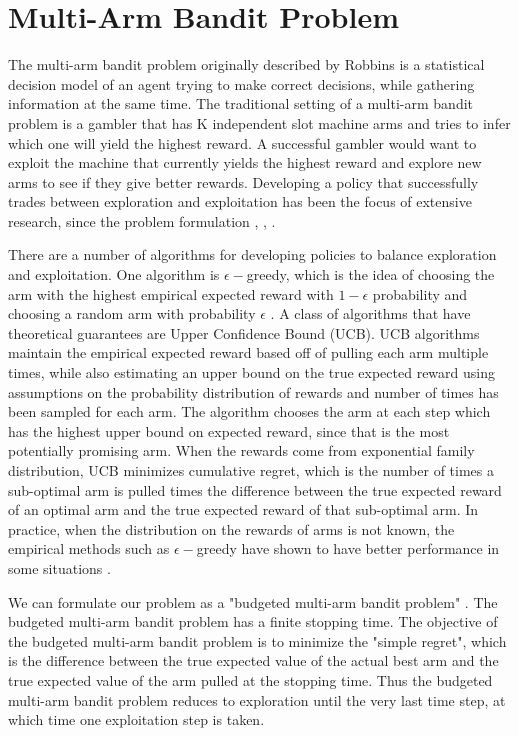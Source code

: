 \documentclass[letterpaper, 10 pt, conference]{ieeeconf}  %
\begin{document}
\section{Multi-Arm Bandit Problem}
The multi-arm bandit problem originally described by Robbins \cite{robbins1985some} is a statistical decision model of an agent trying to make correct decisions, while gathering information at the same time.
The traditional setting of a multi-arm bandit problem is a gambler that has K independent slot machine arms and tries to infer which one will yield the highest reward.
A successful gambler would want to exploit the machine that currently yields the highest reward and explore new arms to see if they give better rewards.
Developing a policy that successfully trades between exploration and exploitation has been the focus of extensive research, since the problem formulation \cite{bubeck2009pure}, \cite{robbins1952some}, \cite{bergemann2006bandit}. 

There are a number of algorithms for developing policies to balance exploration and exploitation.
One algorithm is $\epsilon-$greedy, which is the idea of choosing the arm with the highest empirical expected reward with $1-\epsilon$ probability and choosing a random arm with probability $\epsilon$ \cite{barto1998reinforcement}.
A class of algorithms that have theoretical guarantees are Upper Confidence Bound (UCB).
UCB algorithms maintain the empirical expected reward based off of pulling each arm multiple times, while also estimating an upper bound on the true expected reward using assumptions on the probability distribution of rewards and number of times has been sampled for each arm.
The algorithm chooses the arm at each step which has the highest upper bound on expected reward, since that is the most potentially promising arm.
When the rewards come from exponential family distribution, UCB minimizes cumulative regret, which is the number of times a sub-optimal arm is pulled times the difference between the true expected reward of an optimal arm and the true expected reward of that sub-optimal arm.
In practice, when the distribution on the rewards of arms is not known, the empirical methods such as $\epsilon-$greedy have shown to have better performance in some situations \cite{kuleshov}.

We can formulate our problem as a "budgeted multi-arm bandit problem" \cite{madani2004budgeted}.
The budgeted multi-arm bandit problem has a finite stopping time.
The objective of the budgeted multi-arm bandit problem is to minimize the "simple regret", which is the difference between the true expected value of the actual best arm and the true expected value of the arm pulled at the stopping time.
Thus the budgeted multi-arm bandit problem reduces to exploration until the very last time step, at which time one exploitation step is taken.
\end{document}
